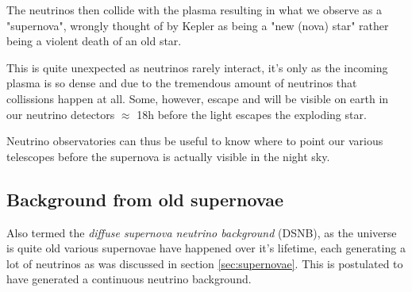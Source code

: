 The neutrinos then collide with the plasma resulting in what we observe as a
"supernova", wrongly thought of by Kepler as being a "new (nova) star" rather
being a violent death of an old star.

This is quite unexpected as neutrinos rarely interact, it's only as the
incoming plasma is so dense and due to the tremendous amount of neutrinos that
collissions happen at all. Some, however, escape and will be visible on earth
in our neutrino detectors $\approx$ 18h before the light escapes the exploding
star.

Neutrino observatories can thus be useful to know where to point our various
telescopes before the supernova is actually visible in the night sky.
\subsection{Background from old supernovae}
Also termed the \textit{diffuse supernova neutrino background} (DSNB), as the
universe is quite old various supernovae have happened over it's lifetime, each generating
a lot of neutrinos as was discussed in section \ref{sec:supernovae}. 
This is postulated to have generated a continuous neutrino background\cite{Beacom_2010}.
